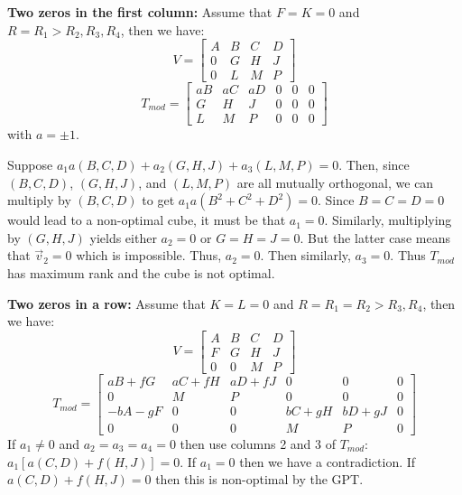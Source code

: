 {\bf Two zeros in the first column:}  Assume
that $F = K = 0$ and $R = R_1 > R_2, R_3, R_4$, then we have:
\begin{equation*}
V =
\begin{bmatrix}
A & B & C & D \\
0 & G & H & J \\
0 & L & M & P
\end{bmatrix}
\end{equation*}
\begin{equation*}
T_{mod} =
\begin{bmatrix}
aB & aC & aD & 0 & 0 & 0 \\
 G &  H &  J & 0 & 0 & 0 \\
 L &  M &  P & 0 & 0 & 0
\end{bmatrix}
\end{equation*}
with $a = \pm1$.

Suppose $a_1 a(B,C,D) + a_2(G,H,J) + a_3(L,M,P) = 0$.  Then, since $(B,C,D)$,
$(G,H,J)$, and $(L,M,P)$ are all mutually orthogonal, we can multiply by
$(B,C,D)$ to get $a_1 a(B^2+C^2+D^2) = 0$.  Since $B = C = D =
0$ would lead to a non-optimal cube, it must be that $a_1 = 0$.  Similarly,
multiplying by $(G,H,J)$ yields either $a_2 = 0$ or $G = H = J = 0$.  But the
latter case means that $\vec{v}_2 = 0$ which is impossible.  Thus, $a_2 = 0$.
Then similarly, $a_3 = 0$.  Thus $T_{mod}$ has maximum rank and the cube is
not optimal.

{\bf Two zeros in a row:}  Assume that $K = L = 0$ and $R = R_1 = R_2 > R_3,
R_4$, then we have:
\begin{equation*}
V =
\begin{bmatrix}
A & B & C & D \\
F & G & H & J \\
0 & 0 & M & P
\end{bmatrix}
\end{equation*}
\begin{equation*}
T_{mod} =
\begin{bmatrix}
 aB+fG & aC+fH & aD+fJ &   0   &   0   & 0 \\
   0   &   M   &   P   &   0   &   0   & 0 \\
-bA-gF &   0   &   0   & bC+gH & bD+gJ & 0 \\
   0   &   0   &   0   &   M   &   P   & 0
\end{bmatrix}
\end{equation*}
If $a_1 \neq 0$ and $a_2 = a_3 = a_4 = 0$ then use columns 2 and 3 of
$T_{mod}$: $a_1[a(C,D)+f(H,J)] = 0$.  If $a_1 = 0$ then we have a
contradiction.  If $a(C,D)+f(H,J) = 0$ then this is non-optimal by the GPT.

